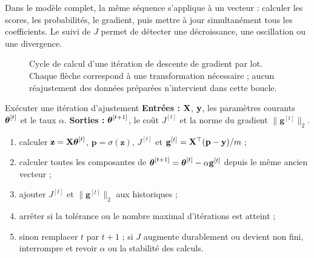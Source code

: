 Dans le modèle complet, la même séquence s'applique à un vecteur : calculer les
scores, les probabilités, le gradient, puis mettre à jour simultanément tous les
coefficients. Le suivi de $J$ permet de détecter une décroissance, une oscillation
ou une divergence.

\begin{figure}[htbp]
\centering
{}
\caption{Cycle de calcul d'une itération de descente de gradient par lot. Chaque
flèche correspond à une transformation nécessaire ; aucun réajustement des
données préparées n'intervient dans cette boucle.}
\label{fig:training-cycle}
\end{figure}

\begin{procedure}{Exécuter une itération d'ajustement}
\textbf{Entrées :} $\mathbf{X}$, $\mathbf{y}$, les paramètres courants $\boldsymbol{\theta}^{[t]}$ et le taux
$\alpha$. \textbf{Sorties :} $\boldsymbol{\theta}^{[t+1]}$, le coût $J^{[t]}$ et la norme du
gradient $\|\mathbf g^{[t]}\|_2$.
\begin{enumerate}
  \item calculer $\mathbf z=\mathbf{X}\boldsymbol{\theta}^{[t]}$, $\mathbf p=\sigma(\mathbf z)$,
        $J^{[t]}$ et $\mathbf g^{[t]}=\mathbf{X}^\top(\mathbf p-\mathbf{y})/m$ ;
  \item calculer toutes les composantes de
        $\boldsymbol{\theta}^{[t+1]}=\boldsymbol{\theta}^{[t]}-\alpha\mathbf g^{[t]}$ depuis le même ancien vecteur ;
  \item ajouter $J^{[t]}$ et $\|\mathbf g^{[t]}\|_2$ aux historiques ;
  \item arrêter si la tolérance ou le nombre maximal d'itérations est atteint ;
  \item sinon remplacer $t$ par $t+1$ ; si $J$ augmente durablement ou devient
        non fini, interrompre et revoir $\alpha$ ou la stabilité des calculs.
\end{enumerate}
\end{procedure}

